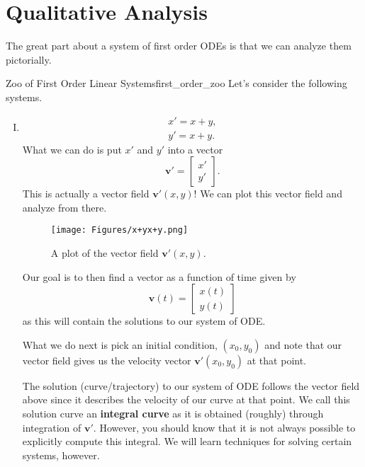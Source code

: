         \section{Qualitative Analysis}
        The great part about a system of first order ODEs is that we can analyze them pictorially. 
        
        \begin{ex}{Zoo of First Order Linear Systems}{first_order_zoo}
        Let's consider the following systems.
        
        \begin{enumerate}[(I)]
            \item 
            \begin{align*}
                x' = x+y,\\
                y' = x+y.
            \end{align*}
            What we can do is put $x'$ and $y'$ into a vector 
            \[
            \mathbf{v}' = \begin{bmatrix} x' \\ y' \end{bmatrix}.
            \]
            This is actually a vector field $\mathbf{v}'(x,y)$!  We can plot this vector field and analyze from there.
            \begin{figure}[H]
                \centering
                \texttt{[image: Figures/x+yx+y.png]}
                \caption{A plot of the vector field $\mathbf{v}'(x,y)$.}
            \end{figure}
            Our goal is to then find a vector as a function of time given by
            \[
            \mathbf{v}(t) = \begin{bmatrix} x(t) \\ y(t) \end{bmatrix}
            \]
            as this will contain the solutions to our system of ODE.
            
            What we do next is pick an initial condition, $(x_0,y_0)$ and note that our vector field gives us the velocity vector $\mathbf{v}'(x_0,y_0)$ at that point. 
            
            The solution (curve/trajectory) to our system of ODE follows the vector field above since it describes the velocity of our curve at that point. We call this solution curve an \textbf{integral curve} as it is obtained (roughly) through integration of $\mathbf{v}'$.  However, you should know that it is not always possible to explicitly compute this integral.  We will learn techniques for solving certain systems, however.
            

\end{enumerate}
\end{ex}
